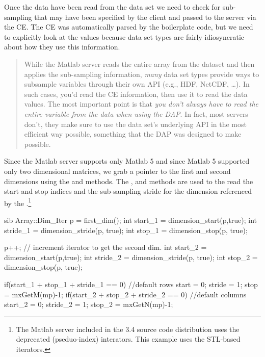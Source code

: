 \documentclass{dods-paper}
\begin{document}
Once the data have been read from the data set we need to check for
sub-sampling that may have been specified by the client and passed to the
server via the CE. The CE was automatically parsed by the boilerplate code,
but we need to explicitly look at the values because data set types are
fairly idiosyncratic about how they use this information.

\begin{quote}
While the Matlab server reads the entire array from the dataset and then
applies the sub-sampling information, \emph{many} data set types provide ways
to subsample variables through their own API (e.g., HDF, NetCDF, \ldots). In
such cases, you'd read the CE information, then use it to read the data
values. The most important point is that \emph{you don't always have to read
  the entire variable from the data when using the DAP}. In fact, most
servers don't, they make sure to use the data set's underlying API in the
most efficient way possible, something that the DAP was designed to make
possible.
\end{quote}

Since the Matlab server supports only Matlab 5 and since Matlab 5 supported
only two dimensional matrices, we grab a pointer to the first and second
dimensions using the  and 
methods. The ,  and
 methods are used to the read the start and stop
indices and the sub-sampling stride for the dimension referenced by the
 .\footnote{The Matlab server included in the 3.4
source code distribution uses the deprecated  (pseduo-index)
interators. This example uses the STL-based iterators.}

\begin{vcode}{sib}
    Array::Dim_Iter p = first_dim();
    int start_1 = dimension_start(p,true);
    int stride_1 = dimension_stride(p, true);
    int stop_1 = dimension_stop(p, true); 

    p++;                        // increment iterator to get the second dim.
    int start_2 = dimension_start(p,true);
    int stride_2 = dimension_stride(p, true);
    int stop_2 = dimension_stop(p, true); 

    if(start_1 + stop_1 + stride_1 == 0){ //default rows
        start = 0;
        stride = 1;
        stop = mxGetM(mp)-1;
    }
    if(start_2 + stop_2 + stride_2 == 0){ //default columns
        start_2 = 0;
        stride_2 = 1;
        stop_2 = mxGetN(mp)-1;
    }
\end{vcode}
\end{document}
